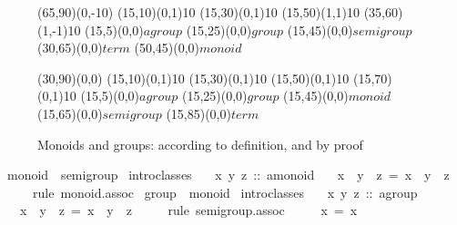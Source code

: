 \begin{isabelle}
\begin{isamarkuptext}
 \begin{figure}[htbp]
   \begin{center}
     \small
     \unitlength 0.6mm
     \begin{picture}(65,90)(0,-10)
       \put(15,10){\line(0,1){10}} \put(15,30){\line(0,1){10}}
       \put(15,50){\line(1,1){10}} \put(35,60){\line(1,-1){10}}
       \put(15,5){\makebox(0,0){$agroup$}}
       \put(15,25){\makebox(0,0){$group$}}
       \put(15,45){\makebox(0,0){$semigroup$}}
       \put(30,65){\makebox(0,0){$term$}} \put(50,45){\makebox(0,0){$monoid$}}
     \end{picture}
     \hspace{4em}
     \begin{picture}(30,90)(0,0)
       \put(15,10){\line(0,1){10}} \put(15,30){\line(0,1){10}}
       \put(15,50){\line(0,1){10}} \put(15,70){\line(0,1){10}}
       \put(15,5){\makebox(0,0){$agroup$}}
       \put(15,25){\makebox(0,0){$group$}}
       \put(15,45){\makebox(0,0){$monoid$}}
       \put(15,65){\makebox(0,0){$semigroup$}}
       \put(15,85){\makebox(0,0){$term$}}
     \end{picture}
     \caption{Monoids and groups: according to definition, and by proof}
     \label{fig:monoid-group}
   \end{center}
 \end{figure}%
\end{isamarkuptext}%
\ monoid\ {\isacharless}\ semigroup\isanewline
{}\ intro{\isacharunderscore}classes\isanewline
\ \ \ x\ y\ z\ ::\ {\isachardoublequote}{\isacharprime}a{\isasymColon}monoid{\isachardoublequote}\isanewline
\ \ \ {\isachardoublequote}x\ {\isasymOtimes}\ y\ {\isasymOtimes}\ z\ =\ x\ {\isasymOtimes}\ {\isacharparenleft}y\ {\isasymOtimes}\ z{\isacharparenright}{\isachardoublequote}\isanewline
\ \ \ \ \ {\isacharparenleft}rule\ monoid.assoc{\isacharparenright}\isanewline
{}\isanewline
\isanewline
{}\ group\ {\isacharless}\ monoid\isanewline
{}\ intro{\isacharunderscore}classes\isanewline
\ \ \ x\ y\ z\ ::\ {\isachardoublequote}{\isacharprime}a{\isasymColon}group{\isachardoublequote}\isanewline
\ \ \ {\isachardoublequote}x\ {\isasymOtimes}\ y\ {\isasymOtimes}\ z\ =\ x\ {\isasymOtimes}\ {\isacharparenleft}y\ {\isasymOtimes}\ z{\isacharparenright}{\isachardoublequote}\isanewline
\ \ \ \ \ {\isacharparenleft}rule\ semigroup.assoc{\isacharparenright}\isanewline
\ \ \ {\isachardoublequote}{\isasymunit}\ {\isasymOtimes}\ x\ =\ x{\isachardoublequote}\isanewline

\end{isabelle}
